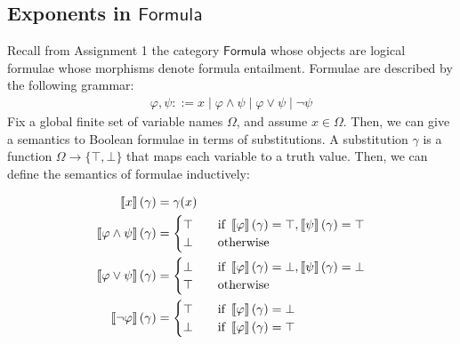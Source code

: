 
\subsection{Exponents in $\mathsf{Formula}$}
Recall from Assignment 1 the category $\mathsf{Formula}$ whose objects are
logical formulae whose morphisms denote formula entailment. 
Formulae are described by the following grammar:
\begin{align}
  \varphi, \psi ::= x \mid \varphi \land \psi \mid \varphi \lor \psi \mid \neg \psi
\end{align}
Fix a global finite set of variable names $\Omega$, and assume $x \in \Omega$. 
Then, we can give a semantics to Boolean formulae in terms of substitutions.
A
substitution $\gamma$ is a function $\Omega \to \{\top, \bot\}$ that maps each variable 
to a truth value. Then, we can define the semantics of formulae inductively:

\begin{align*}
  \left\llbracket x \right\rrbracket(\gamma) &= \gamma(x)\\
  \left\llbracket \varphi \land \psi \right\rrbracket(\gamma) &= \begin{cases}
  \top \quad& \text{if } \left\llbracket \varphi \right\rrbracket(\gamma) = \top, \left\llbracket \psi \right\rrbracket(\gamma) = \top\\
  \bot \quad& \text{otherwise}
  \end{cases}\\
  \left\llbracket \varphi \lor \psi \right\rrbracket(\gamma) &= \begin{cases}
  \bot \quad& \text{if } \left\llbracket \varphi \right\rrbracket(\gamma) = \bot, \left\llbracket \psi \right\rrbracket(\gamma) = \bot\\
  \top \quad& \text{otherwise}
  \end{cases}\\
  \left\llbracket \neg \varphi \right\rrbracket(\gamma) &= \begin{cases}
  \top \quad& \text{if } \left\llbracket \varphi \right\rrbracket(\gamma) = \bot\\
  \bot \quad& \text{if } \left\llbracket \varphi \right\rrbracket(\gamma) = \top
  \end{cases}
\end{align*}

